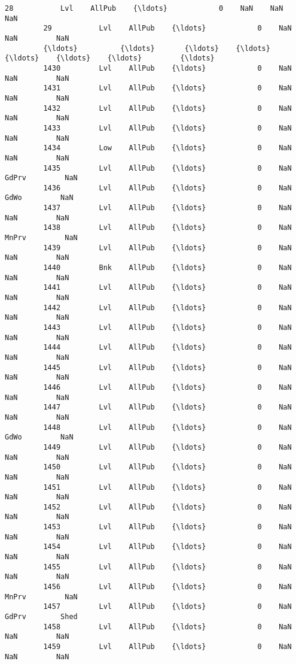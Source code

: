 \documentclass[11pt]{article}
\begin{document}
\begin{Verbatim}[commandchars=\\\{\}]
         28           Lvl    AllPub    {\ldots}            0    NaN    NaN         NaN   
         29           Lvl    AllPub    {\ldots}            0    NaN    NaN         NaN   
         {\ldots}          {\ldots}       {\ldots}    {\ldots}          {\ldots}    {\ldots}    {\ldots}         {\ldots}   
         1430         Lvl    AllPub    {\ldots}            0    NaN    NaN         NaN   
         1431         Lvl    AllPub    {\ldots}            0    NaN    NaN         NaN   
         1432         Lvl    AllPub    {\ldots}            0    NaN    NaN         NaN   
         1433         Lvl    AllPub    {\ldots}            0    NaN    NaN         NaN   
         1434         Low    AllPub    {\ldots}            0    NaN    NaN         NaN   
         1435         Lvl    AllPub    {\ldots}            0    NaN  GdPrv         NaN   
         1436         Lvl    AllPub    {\ldots}            0    NaN   GdWo         NaN   
         1437         Lvl    AllPub    {\ldots}            0    NaN    NaN         NaN   
         1438         Lvl    AllPub    {\ldots}            0    NaN  MnPrv         NaN   
         1439         Lvl    AllPub    {\ldots}            0    NaN    NaN         NaN   
         1440         Bnk    AllPub    {\ldots}            0    NaN    NaN         NaN   
         1441         Lvl    AllPub    {\ldots}            0    NaN    NaN         NaN   
         1442         Lvl    AllPub    {\ldots}            0    NaN    NaN         NaN   
         1443         Lvl    AllPub    {\ldots}            0    NaN    NaN         NaN   
         1444         Lvl    AllPub    {\ldots}            0    NaN    NaN         NaN   
         1445         Lvl    AllPub    {\ldots}            0    NaN    NaN         NaN   
         1446         Lvl    AllPub    {\ldots}            0    NaN    NaN         NaN   
         1447         Lvl    AllPub    {\ldots}            0    NaN    NaN         NaN   
         1448         Lvl    AllPub    {\ldots}            0    NaN   GdWo         NaN   
         1449         Lvl    AllPub    {\ldots}            0    NaN    NaN         NaN   
         1450         Lvl    AllPub    {\ldots}            0    NaN    NaN         NaN   
         1451         Lvl    AllPub    {\ldots}            0    NaN    NaN         NaN   
         1452         Lvl    AllPub    {\ldots}            0    NaN    NaN         NaN   
         1453         Lvl    AllPub    {\ldots}            0    NaN    NaN         NaN   
         1454         Lvl    AllPub    {\ldots}            0    NaN    NaN         NaN   
         1455         Lvl    AllPub    {\ldots}            0    NaN    NaN         NaN   
         1456         Lvl    AllPub    {\ldots}            0    NaN  MnPrv         NaN   
         1457         Lvl    AllPub    {\ldots}            0    NaN  GdPrv        Shed   
         1458         Lvl    AllPub    {\ldots}            0    NaN    NaN         NaN   
         1459         Lvl    AllPub    {\ldots}            0    NaN    NaN         NaN   
         

\end{Verbatim}
\end{document}
